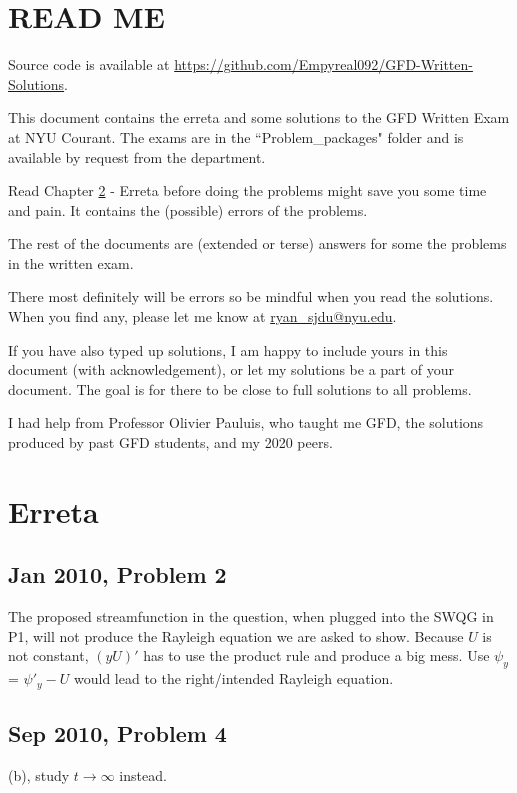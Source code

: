 \documentclass[11pt,letterpaper]{book}
\theoremstyle{definition}
\begin{document}
\renewcommand\thesection{\arabic{section}.}
\renewcommand\thesubsection{(\arabic{section}.\alph{subsection})}

\setcounter{tocdepth}{1}
\tableofcontents

\chapter{READ ME}
Source code is available at \url{https://github.com/Empyreal092/GFD-Written-Solutions}.

This document contains the erreta and some solutions to the GFD Written Exam at NYU Courant. The exams are in the ``Problem\_packages" folder and is available by request from the department.

Read Chapter \ref{chap:erreta} - Erreta before doing the problems might save you some time and pain. It contains the (possible) errors of the problems. 

The rest of the documents are (extended or terse) answers for some the problems in the written exam.

There most definitely will be errors so be mindful when you read the solutions. When you find any, please let me know at \url{ryan_sjdu@nyu.edu}. 

If you have also typed up solutions, I am happy to include yours in this document (with acknowledgement), or let my solutions be a part of your document. The goal is for there to be close to full solutions to all problems. 

I had help from Professor Olivier Pauluis, who taught me GFD, the solutions produced by past GFD students, and my 2020 peers.


\chapter{Erreta}\label{chap:erreta}
\section{Jan 2010, Problem 2}
The proposed streamfunction in the question, when plugged into the SWQG in P1, will not produce the Rayleigh equation we are asked to show. Because $U$ is not constant, $(yU)'$ has to use the product rule and produce a big mess. Use $\psi_y$ = $\psi'_y-U$ would lead to the right/intended Rayleigh equation.

\section{Sep 2010, Problem 4}
(b), study $t\to \infty$ instead.
\end{document}
